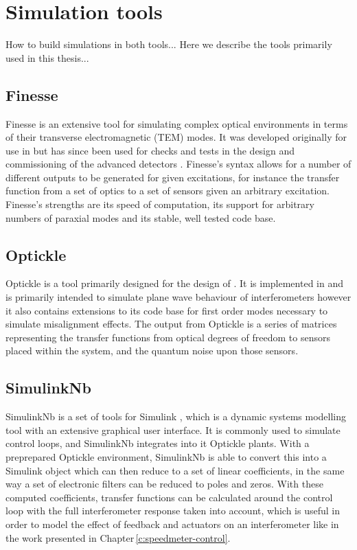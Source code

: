 \chapter{\label{a:simulation-tools}Simulation tools}
How to build simulations in both tools...
Here we describe the tools primarily used in this thesis...



\section{\label{sec:finesse-sim}Finesse}
Finesse is an extensive tool for simulating complex optical environments in terms of their transverse electromagnetic (\gls{TEM}) modes. It was developed originally for use in \GEO{} \cite{Freise2004} but has since been used for checks and tests in the design and commissioning of the advanced detectors \cite{Mueller2015, Kumeta2015}. Finesse's syntax allows for a number of different outputs to be generated for given excitations, for instance the transfer function from a set of optics to a set of sensors given an arbitrary excitation. Finesse's strengths are its speed of computation, its support for arbitrary numbers of paraxial modes and its stable, well tested code base.

\section{\label{sec:optickle-sim}Optickle}
Optickle is a tool primarily designed for the design of \ALIGO{}. It is implemented in \MATLAB{} and is primarily intended to simulate plane wave behaviour of interferometers however it also contains extensions to its code base for first order modes necessary to simulate misalignment effects. The output from Optickle is a series of matrices representing the transfer functions from optical degrees of freedom to sensors placed within the system, and the quantum noise upon those sensors.

\section{\label{sec:simulinknb-sim}SimulinkNb}
SimulinkNb is a set of tools for \MATLAB{} Simulink \cite{SimulinkNb}, which is a dynamic systems modelling tool with an extensive graphical user interface. It is commonly used to simulate control loops, and SimulinkNb integrates into it Optickle plants. With a preprepared Optickle environment, SimulinkNb is able to convert this into a Simulink object which \MATLAB{} can then reduce to a set of linear coefficients, in the same way a set of electronic filters can be reduced to poles and zeros. With these computed coefficients, transfer functions can be calculated around the control loop with the full interferometer response taken into account, which is useful in order to model the effect of feedback and actuators on an interferometer like in the work presented in Chapter\,\ref{c:speedmeter-control}.

